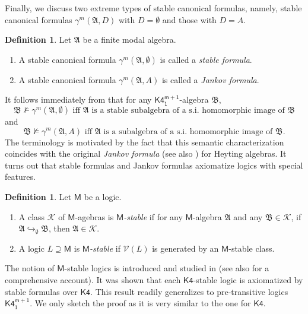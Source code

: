 \documentclass[a4paper,11pt]{article}
\theoremstyle{definition}
\newtheorem{definition}[theorem]{Definition}
\theoremstyle{remark}
\numberwithin{theorem}{section}
\newcommand{\alg}[1]{\mathfrak{#1}}
\newcommand{\A}{\alg{A}}
\newcommand{\B}{\alg{B}}
\newcommand{\class}[1]{\mathcal{#1}}
\newcommand{\V}{\class{V}}
\newcommand{\logic}[1]{\mathsf{#1}}
\newcommand{\Kf}{\logic{K4}}
\newcommand{\Kff}[2]{\logic{K4^{#1}_{#2}}}
\newcommand{\emp}{\emptyset}
\newcommand{\inj}{\hookrightarrow}
\begin{document}
Finally, we discuss two extreme types of stable canonical formulas, namely, stable canonical formulas $\gamma^m(\A, D)$ with $D = \emp$ and those with $D = A$. 

\begin{definition} \label{3: Def stable and Jankov formulas}
    Let $\A$ be a finite modal algebra.
    \begin{enumerate}
        \item A stable canonical formula $\gamma^m(\A, \emp)$ is called a \emph{stable formula}.
        \item A stable canonical formula $\gamma^m(\A, A)$ is called a \emph{Jankov formula}.
    \end{enumerate}
\end{definition}


It follows immediately from  that for any $\Kff{m+1}{1}$-algebra $\B$,
\[\B \not\models \gamma^m(\A, \emp) \text{ iff $\A$ is a stable subalgebra of a s.i.~homomorphic image of $\B$}\]
and
\[\B \not\models \gamma^m(\A, A) \text{ iff $\A$ is a subalgebra of a s.i.~homomorphic image of $\B$.}\]
The terminology is motivated by the fact that this semantic characterization coincides with the original \emph{Jankov formula} \cite{jankov1963} (see also \cite{dejongh1968}) for Heyting algebras. It turns out that stable formulas and Jankov formulas axiomatize logics with special features.



\begin{definition} \label{3: Def M-stable logic} 
    Let $\logic{M}$ be a logic.
    \begin{enumerate}
        \item A class $\class{K}$ of $\logic{M}$-agebras is \emph{$\logic{M}$-stable} if for any $\logic{M}$-algebra $\A$ and any $\B \in \class{K}$, if $\A \inj_\emp \B$, then $\A \in \class{K}$. 
        \item A logic $L \supseteq \logic{M}$ is \emph{$\logic{M}$-stable} if $\V(L)$ is generated by an $\logic{M}$-stable class. 
    \end{enumerate}
\end{definition}

The notion of $\logic{M}$-stable logics is introduced and studied in \cite{stablemodallogic} (see also \cite{FiltrationRevisitedLattices2018} for a comprehensive account). It was shown that each $\Kf$-stable logic is axiomatized by stable formulas over $\Kf$. This result readily generalizes to pre-transitive logics $\Kff{m+1}{1}$. We only sketch the proof as it is very similar to the one for $\Kf$.
\end{document}
